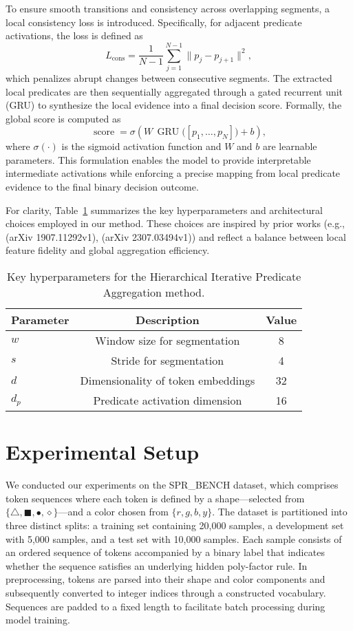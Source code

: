 \documentclass[11pt]{article}
\begin{document}
To ensure smooth transitions and consistency across overlapping segments, a local consistency loss is introduced. Specifically, for adjacent predicate activations, the loss is defined as
\[
L_{\mathrm{cons}} = \frac{1}{N-1} \sum_{j=1}^{N-1} \| p_j - p_{j+1} \|^2,
\]
which penalizes abrupt changes between consecutive segments. The extracted local predicates are then sequentially aggregated through a gated recurrent unit (GRU) to synthesize the local evidence into a final decision score. Formally, the global score is computed as
\[
\operatorname{score} = \sigma\left(W\,\operatorname{GRU}\big([p_1,\dots,p_N]\big) + b\right),
\]
where \(\sigma(\cdot)\) is the sigmoid activation function and \(W\) and \(b\) are learnable parameters. This formulation enables the model to provide interpretable intermediate activations while enforcing a precise mapping from local predicate evidence to the final binary decision outcome.

For clarity, Table~\ref{tab:params} summarizes the key hyperparameters and architectural choices employed in our method. These choices are inspired by prior works (e.g., (arXiv 1907.11292v1), (arXiv 2307.03494v1)) and reflect a balance between local feature fidelity and global aggregation efficiency.

\begin{table}[h]
\centering
\begin{tabular}{lcc}
\hline
Parameter & Description & Value\\
\hline
\(w\) & Window size for segmentation & 8\\
\(s\) & Stride for segmentation & 4\\
\(d\) & Dimensionality of token embeddings & 32\\
\(d_p\) & Predicate activation dimension & 16\\
\hline
\end{tabular}
\caption{Key hyperparameters for the Hierarchical Iterative Predicate Aggregation method.}
\label{tab:params}
\end{table}

\section{Experimental Setup}
We conducted our experiments on the SPR\_BENCH dataset, which comprises token sequences where each token is defined by a shape—selected from $\{\triangle, \blacksquare, \bullet, \diamond\}$—and a color chosen from $\{r, g, b, y\}$. The dataset is partitioned into three distinct splits: a training set containing 20,000 samples, a development set with 5,000 samples, and a test set with 10,000 samples. Each sample consists of an ordered sequence of tokens accompanied by a binary label that indicates whether the sequence satisfies an underlying hidden poly-factor rule. In preprocessing, tokens are parsed into their shape and color components and subsequently converted to integer indices through a constructed vocabulary. Sequences are padded to a fixed length to facilitate batch processing during model training.
\end{document}

